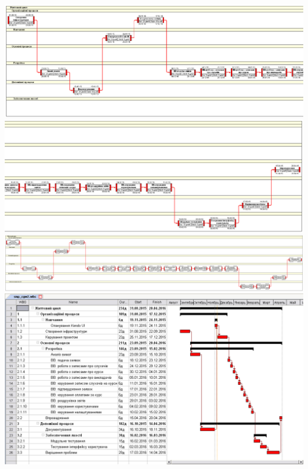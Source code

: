 \begin{landscape}
\includegraphics[width=24cm]{smp_cgw2_2.png}\\
\includegraphics[width=24cm]{smp_cgw2_3.png}\\
\includegraphics[width=24cm]{smp_cgw2_4.png}
\includegraphics[width=24cm]{smp_cgw2_1.png}
\end{landscape}
